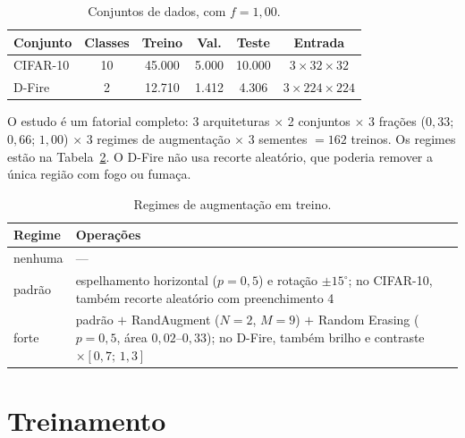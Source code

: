 \begin{table}[htb]
  \centering
  \caption{Conjuntos de dados, com $f = 1{,}00$.}
  \label{tab:datasets}
  \small
  \begin{tabular}{lccccc}
    \toprule
    Conjunto & Classes & Treino & Val. & Teste & Entrada \\
    \midrule
    CIFAR-10 & 10 & 45.000 & 5.000 & 10.000 & $3\times32\times32$ \\
    D-Fire   & 2  & 12.710 & 1.412 & 4.306  & $3\times224\times224$ \\
    \bottomrule
  \end{tabular}
\end{table}

O estudo é um fatorial completo: 3 arquiteturas $\times$ 2 conjuntos $\times$ 3
frações ($0{,}33$; $0{,}66$; $1{,}00$) $\times$ 3 regimes de augmentação
$\times$ 3 sementes $= 162$ treinos. Os regimes estão na
Tabela~\ref{tab:aug-regimes}. O D-Fire não usa recorte aleatório, que poderia
remover a única região com fogo ou fumaça.

\begin{table}[htb]
  \centering
  \caption{Regimes de augmentação em treino.}
  \label{tab:aug-regimes}
  \small
  \begin{tabular}{l p{}}
    \toprule
    Regime & Operações \\
    \midrule
    nenhuma & --- \\
    padrão  & espelhamento horizontal ($p=0{,}5$) e rotação $\pm15^{\circ}$;
              no CIFAR-10, também recorte aleatório com preenchimento 4 \\
    forte   & padrão $+$ RandAugment ($N=2$, $M=9$) $+$ Random Erasing
              ($p=0{,}5$, área $0{,}02$--$0{,}33$); no D-Fire, também brilho e
              contraste $\times[0{,}7;\,1{,}3]$ \\
    \bottomrule
  \end{tabular}
\end{table}

\section{Treinamento}
\label{sec:protocol:training}

